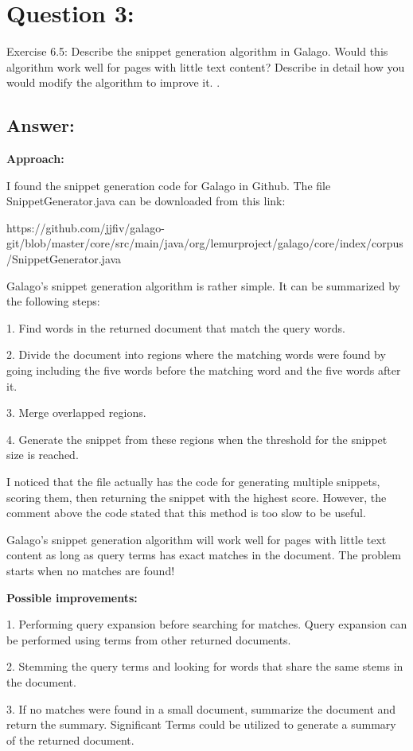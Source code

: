 \section*{Question 3:}
Exercise 6.5:
Describe the snippet generation algorithm in Galago. Would this algorithm work well for pages with little text content? Describe in detail how you would modify the algorithm to improve it. .

\subsection*{Answer:}

\textbf{Approach:}

I found the snippet generation code for Galago in Github. The file SnippetGenerator.java can be downloaded from this link:

https://github.com/jjfiv/galago-git/blob/master/core/src/main/java/org/lemurproject/galago/core/index/corpus/SnippetGenerator.java

Galago's snippet generation algorithm is rather simple. It can be summarized by the following steps:

1. Find words in the returned document that match the query words.

2. Divide the document into regions where the matching words were found by going including the five words before the matching word and the five words after it.

3. Merge overlapped regions.

4. Generate the snippet from these regions when the threshold for the snippet size is reached. 

I noticed that the file actually has the code for generating multiple snippets, scoring them, then returning the snippet with the highest score. However, the comment above the code stated that this method is too slow to be useful.

Galago's snippet generation algorithm will work well for pages with little text content as long as query terms has exact matches in the document. The problem starts when no matches are found!

\textbf{Possible improvements:}

1. Performing query expansion before searching for matches. Query expansion can be performed using terms from other returned documents.

2. Stemming the query terms and looking for words that share the same stems in the document.

3. If no matches were found in a small document, summarize the document and return the summary. Significant Terms could be utilized to generate a summary of the returned document.


